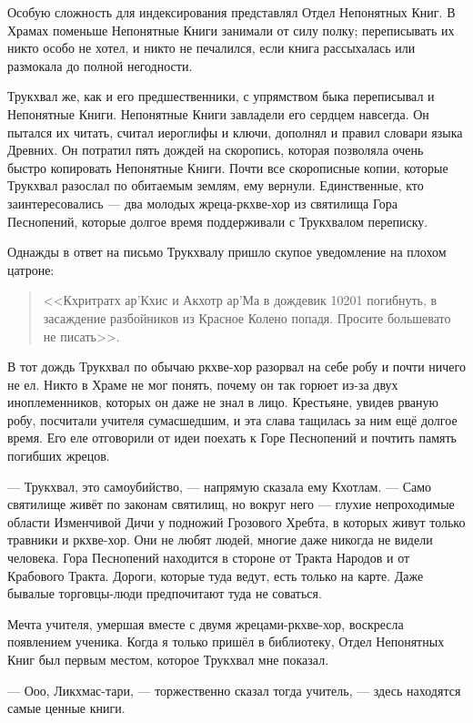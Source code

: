 Особую сложность для индексирования представлял Отдел Непонятных Книг.
В Храмах поменьше Непонятные Книги занимали от силу полку;
переписывать их никто особо не хотел, и никто не печалился, если книга рассыхалась или размокала до полной негодности.

Трукхвал же, как и его предшественники, с упрямством быка переписывал и Непонятные Книги.
Непонятные Книги завладели его сердцем навсегда.
Он пытался их читать, считал иероглифы и ключи, дополнял и правил словари языка Древних.
Он потратил пять дождей на скоропись, которая позволяла очень быстро копировать Непонятные Книги.
Почти все скорописные копии, которые Трукхвал разослал по обитаемым землям, ему вернули.
Единственные, кто заинтересовались --- два молодых жреца-ркхве-хор из святилища Гора Песнопений, которые долгое время поддерживали с Трукхвалом переписку.

Однажды в ответ на письмо Трукхвалу пришло скупое уведомление на плохом цатроне:

\begin{quote}
<<Кхритратх ар'Кхис и Акхотр ар'Ма в дождевик 10201 погибнуть, в засаждение разбойников из Красное Колено попадя.
Просите большевато не писать>>.
\end{quote}

В тот дождь Трукхвал по обычаю ркхве-хор разорвал на себе робу и почти ничего не ел.
Никто в Храме не мог понять, почему он так горюет из-за двух иноплеменников, которых он даже не знал в лицо.
Крестьяне, увидев рваную робу, посчитали учителя сумасшедшим, и эта слава тащилась за ним ещё долгое время.
Его еле отговорили от идеи поехать к Горе Песнопений и почтить память погибших жрецов.

--- Трукхвал, это самоубийство, --- напрямую сказала ему Кхотлам.
--- Само святилище живёт по законам святилищ, но вокруг него --- глухие непроходимые области Изменчивой Дичи у подножий Грозового Хребта, в которых живут только травники и ркхве-хор.
Они не любят людей, многие даже никогда не видели человека.
Гора Песнопений находится в стороне от Тракта Народов и от Крабового Тракта.
Дороги, которые туда ведут, есть только на карте.
Даже бывалые торговцы-люди предпочитают туда не соваться.

Мечта учителя, умершая вместе с двумя жрецами-ркхве-хор, воскресла появлением ученика.
Когда я только пришёл в библиотеку, Отдел Непонятных Книг был первым местом, которое Трукхвал мне показал.

--- Ооо, Ликхмас-тари, --- торжественно сказал тогда учитель, --- здесь находятся самые ценные книги.

